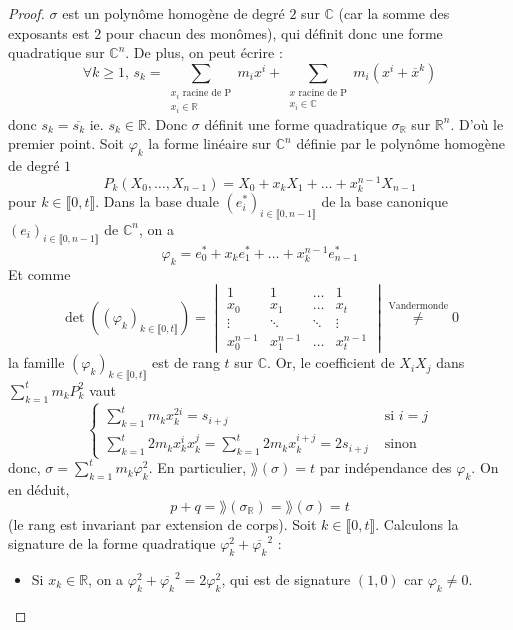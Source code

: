   \begin{proof}
    $\sigma$ est un polynôme homogène de degré $2$ sur $\mathbb{C}$ (car la somme des exposants est $2$ pour chacun des monômes), qui définit donc une forme quadratique sur $\mathbb{C}^n$. De plus, on peut écrire :
    \[ \forall k \geq 1, \, s_k = \sum_{\substack{x_i \text{ racine de P} \\ x_i \in \mathbb{R}}} m_i x^i + \sum_{\substack{x \text{ racine de P} \\ x_i \in \mathbb{C}}} m_i (x^i + \overline{x}^k) \]
    donc $s_k = \overline{s_k}$ ie. $s_k \in \mathbb{R}$. Donc $\sigma$ définit une forme quadratique $\sigma_{\mathbb{R}}$ sur $\mathbb{R}^n$. D'où le premier point.
    \newpar
    Soit $\varphi_k$ la forme linéaire sur $\mathbb{C}^n$ définie par le polynôme homogène de degré $1$
    \[ P_k(X_0, \dots, X_{n-1}) = X_0 + x_k X_1 + \dots + x_k^{n-1} X_{n-1} \]
    pour $k \in \llbracket 0, t \rrbracket$. Dans la base duale $(e_i^*)_{i \in \llbracket 0, n-1 \rrbracket}$ de la base canonique $(e_i)_{i \in \llbracket 0, n-1 \rrbracket}$ de $\mathbb{C}^n$, on a
    \[ \varphi_k = e_0^* + x_k e_1^* + \dots + x_k^{n-1} e_{n-1}^* \]
    Et comme
    \[ \det((\varphi_k)_{k \in \llbracket 0, t \rrbracket}) = \begin{vmatrix} 1 & 1 & \dots & 1 \\ x_0 & x_1 & \dots & x_t \\ \vdots & \ddots & \ddots & \vdots \\ x_0^{n-1} & x_1^{n-1} & \dots & x_t^{n-1} \end{vmatrix} \overset{\text{Vandermonde}}{\neq} 0 \]
    la famille $(\varphi_k)_{k \in \llbracket 0, t \rrbracket}$ est de rang $t$ sur $\mathbb{C}$. Or, le coefficient de $X_i X_j$ dans $\sum_{k=1}^t m_k P_k^2$ vaut
    \[ \begin{cases} \sum_{k=1}^t m_k x_k^{2i} = s_{i+j} &\text{ si } i=j \\ \sum_{k=1}^t 2 m_k x_k^i x_k^j = \sum_{k=1}^t 2 m_k x_k^{i+j} = 2s_{i+j} &\text{ sinon} \end{cases} \]
    donc, $\sigma = \sum_{k=1}^t m_k \varphi_k^2$. En particulier, $\rang (\sigma) = t$ par indépendance des $\varphi_k$. On en déduit,
    \[ p+q = \rang(\sigma_{\mathbb{R}}) = \rang(\sigma) = t \]
    (le rang est invariant par extension de corps).
    \newpar
    Soit $k \in \llbracket 0, t \rrbracket$. Calculons la signature de la forme quadratique $\varphi_k^2 + \overline{\varphi_k}^2$ :
    \begin{itemize}
      \item Si $x_k \in \mathbb{R}$, on a $\varphi_k^2 + \overline{\varphi_k}^2 = 2 \varphi_k^2$, qui est de signature $(1, 0)$ car $\varphi_k \neq 0$.

\end{itemize}
\end{proof}
